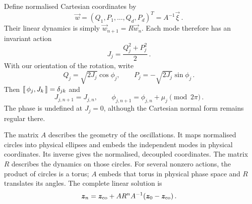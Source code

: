 Define normalised Cartesian coordinates by
\begin{equation}\label{eq:lnf-normalised-coordinates}
    \vec w = (Q_1,P_1,\ldots,Q_d,P_d)^T = A^{-1}\vec\xi\,.
\end{equation}
Their linear dynamics is simply $\vec w_{n + 1} = R\vec w_n$.
Each mode therefore has an invariant action
\begin{equation}\label{eq:lnf-action}
    J_j = \frac{Q_j^2 + P_j^2}{2}\,.
\end{equation}
With our orientation of the rotation, write
\begin{equation}\label{eq:lnf-action-angle}
    Q_j = \sqrt{2J_j}\cos\phi_j,
    \qquad P_j = -\sqrt{2J_j}\sin\phi_j\,.
\end{equation}
Then $\poisson{\phi_j}{J_k} = \delta_{jk}$ and
\begin{equation}
    J_{j,n + 1} = J_{j,n},\qquad
    \phi_{j,n + 1} = \phi_{j,n} + \mu_j\pmod{2\pi}\,.
\end{equation}
The phase is undefined at $J_j = 0$, although the Cartesian normal form
remains regular there.

The matrix $A$ describes the geometry of the oscillations. It maps
normalised circles into physical ellipses and embeds the independent
modes in physical coordinates. Its inverse gives the normalised,
decoupled coordinates. The matrix $R$ describes the dynamics on those circles.
For several nonzero actions, the product of circles is a torus; $A$ embeds
that torus in physical phase space and $R$ translates its angles.
The complete linear solution is
\begin{equation}\label{eq:lnf-solution}
    \vec z_n = \vec z_{\rm co} + A R^n A^{-1}
    (\vec z_0-\vec z_{\rm co})\,.
\end{equation}

